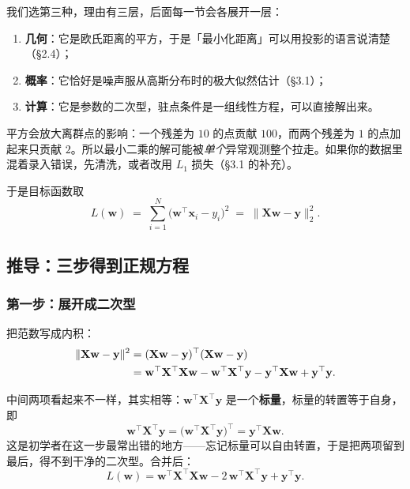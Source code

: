 \documentclass[11pt,a4paper,fontset=windows,zihao=-4]{ctexart}
\newcommand{\bX}{\mathbf{X}}
\newcommand{\by}{\mathbf{y}}
\newcommand{\bw}{\mathbf{w}}
\newcommand{\bx}{\mathbf{x}}
\newcommand{\tp}{^{\top}}
\newcommand{\norm}[1]{\lVert #1\rVert}
\begin{document}
我们选第三种，理由有三层，后面每一节会各展开一层：
\begin{enumerate}[label=(\arabic*)]
  \item \textbf{几何}：它是欧氏距离的平方，于是「最小化距离」可以用投影的语言说清楚（\S2.4）；
  \item \textbf{概率}：它恰好是噪声服从高斯分布时的极大似然估计（\S3.1）；
  \item \textbf{计算}：它是参数的二次型，驻点条件是一组线性方程，可以直接解出来。
\end{enumerate}

\begin{warn}[平方的代价]
平方会放大离群点的影响：一个残差为 $10$ 的点贡献 $100$，而两个残差为 $1$ 的点加起来只贡献 $2$。所以最小二乘的解可能被\emph{单个}异常观测整个拉走。如果你的数据里混着录入错误，先清洗，或者改用 $L_1$ 损失（\S3.1 的补充）。
\end{warn}

于是目标函数取
\begin{equation}
  L(\bw)\;=\;\sum_{i=1}^{N}\bigl(\bw\tp\bx_i-y_i\bigr)^2
  \;=\;\norm{\bX\bw-\by}_2^2 .
  \label{eq:loss}
\end{equation}

\subsection{推导：三步得到正规方程}

\subsubsection{第一步：展开成二次型}

把范数写成内积：
\begin{align}
  \norm{\bX\bw-\by}^2
  &=(\bX\bw-\by)\tp(\bX\bw-\by)\notag\\
  &=\bw\tp\bX\tp\bX\bw-\bw\tp\bX\tp\by-\by\tp\bX\bw+\by\tp\by .
  \label{eq:expand}
\end{align}

中间两项看起来不一样，其实相等：$\bw\tp\bX\tp\by$ 是一个\textbf{标量}，标量的转置等于自身，即
\begin{equation}
  \bw\tp\bX\tp\by=\bigl(\bw\tp\bX\tp\by\bigr)\tp=\by\tp\bX\bw .
\end{equation}
这是初学者在这一步最常出错的地方——忘记标量可以自由转置，于是把两项留到最后，得不到干净的二次型。合并后：
\begin{equation}
  L(\bw)=\bw\tp\bX\tp\bX\bw-2\,\bw\tp\bX\tp\by+\by\tp\by .
  \label{eq:quadratic}
\end{equation}
\end{document}
